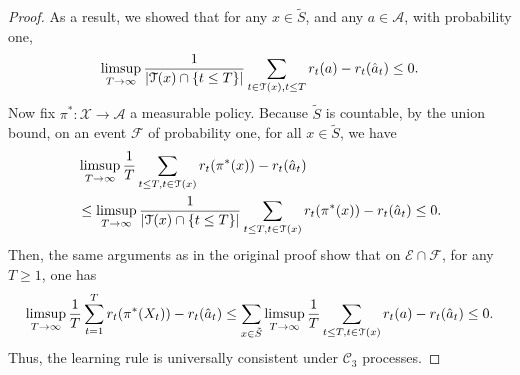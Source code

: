 \documentclass[aos]{imsart}
\theoremstyle{plain}
\theoremstyle{remark}
\newcommand{\Acal}{\mathcal{A}}
\newcommand{\Ccal}{\mathcal{C}}
\newcommand{\Ecal}{\mathcal{E}}
\newcommand{\Fcal}{\mathcal{F}}
\newcommand{\Tcal}{\mathcal{T}}
\newcommand{\Xcal}{\mathcal{X}}
\newcommand{\1}{\mathbbm{1}}%
\renewcommand{\limsup}{\mathop{\rm limsup}}
\begin{document}
\begin{proof}
As a result, we showed that for any $x\in\tilde S$, and any $a\in\Acal$, with probability one,
\begin{equation*}
    \limsup_{T\to\infty}\frac{1}{|\Tcal(x)\cap\{t\leq T\}|}\sum_{t\in\Tcal(x),t\leq T} r_t(a) - r_t(\hat a_t) \leq 0.
\end{equation*}
Now fix $\pi^*:\Xcal\to\Acal$ a measurable policy. Because $\tilde S$ is countable, by the union bound, on an event $\Fcal$ of probability one, for all $x\in\tilde S$, we have
\begin{align*}
    &\limsup_{T\to\infty}\frac{1}{T}\sum_{t\leq T, t\in\Tcal(x)} r_t(\pi^*(x)) - r_t(\hat a_t) \\
    &\leq \limsup_{T\to\infty}\frac{1}{|\Tcal(x)\cap\{t\leq T\}|}\sum_{t\leq T, t\in\Tcal(x)} r_t(\pi^*(x)) - r_t(\hat a_t) \leq 0.
\end{align*}
Then, the same arguments as in the original proof show that on $\Ecal\cap\Fcal$, for any $T\geq 1$, one has
\begin{equation*}
    \limsup_{T\to\infty} \frac{1}{T}\sum_{t=1}^T r_t(\pi^*(X_t))-r_t(\hat a_t) \leq \sum_{x\in \tilde S} \limsup_{T\to\infty} \frac{1}{T}\sum_{t\leq T, t\in\Tcal(x)} r_t(a) - r_t(\hat a_t) \leq 0.
\end{equation*}
Thus, the learning rule is universally consistent under $\Ccal_3$ processes.


\end{proof}
\end{document}
